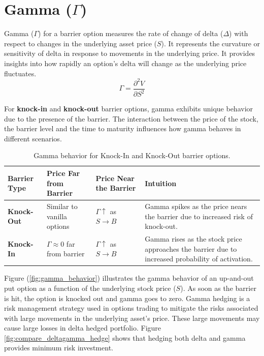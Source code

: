 \section{Gamma (\(\Gamma\))}

Gamma (\(\Gamma\)) for a barrier option measures the rate of change of delta (\(\Delta\)) with respect to changes in the underlying asset price (\(S\)). It represents the curvature or sensitivity of delta in response to movements in the underlying price. It provides insights into how rapidly an option's delta will change as the underlying price fluctuates.
\[
\Gamma = \frac{\partial^2 V}{\partial S^2}
\]

For \textbf{knock-in} and \textbf{knock-out} barrier options, gamma exhibits unique behavior due to the presence of the barrier. The interaction between the price of the stock, the barrier level and the time to maturity influences how gamma behaves in different scenarios.

\begin{center}
	\begin{table}[H]
		\begin{tabular}{ | m{3cm} | m{5cm}| m{4cm} | m{4cm}|} 
			\hline
			\textbf{Barrier Type} & \textbf{Price Far from Barrier} & \textbf{Price Near the Barrier} & \textbf{Intuition}  \\ 
			\hline
			\textbf{Knock-Out} & Similar to vanilla options     & $\Gamma \uparrow$ as $S \to B$  & Gamma spikes as the price nears the barrier due to increased risk of knock-out. \\ 
			\hline
			\textbf{Knock-In}    & $\Gamma \approx 0$ far from barrier   & $\Gamma \uparrow$ as $S \to B$  & Gamma rises as the stock price approaches the barrier due to increased probability of activation. \\ 
			\hline
		\end{tabular}
		\caption{Gamma behavior for Knock-In and Knock-Out barrier options.}
		\label{tab:gamma_barrier_options}
	\end{table}
\end{center}

Figure (\ref{fig:gamma_behavior}) illustrates the gamma behavior of an up-and-out put option as a function of the underlying stock price (\(S\)). As soon as the barrier is hit, the option is knocked out and gamma goes to zero. Gamma hedging is a risk management strategy used in options trading to mitigate the risks associated with large movements in the underlying asset's price. These large movements may cause large losses in delta hedged portfolio. Figure \ref{fig:compare_deltagamma_hedge} shows that hedging both delta and gamma provides minimum risk investment.

